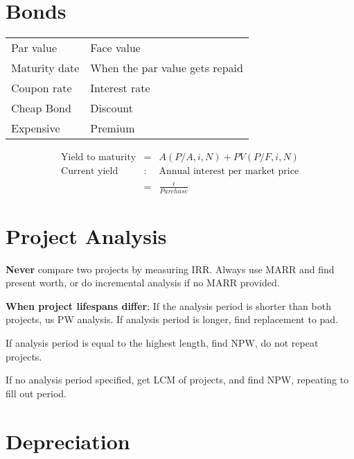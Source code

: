\documentclass[landscape, letterpaper, 10pt]{article}
\begin{document}
\begin{multicols}{3}
    \section*{Bonds}
    \begin{tabular}{|l|l|}
        \hline
        Par value     & Face value                     \\
        Maturity date & When the par value gets repaid \\\hline
        Coupon rate   & Interest rate                  \\\hline
        Cheap Bond    & Discount                       \\\hline
        Expensive     & Premium                        \\\hline
    \end{tabular}
    \begin{align*}
        \text{Yield to maturity} & = & A(P/A, i, N) + PV(P/F, i, N)            \\
        \text{Current yield}     & : & \text{Annual interest per market price} \\
                                 & = & \frac{i}{Purchase}
    \end{align*}
    \section*{Project Analysis}
    \textbf{Never} compare two projects by measuring IRR. Always use MARR and find present worth, or do incremental analysis if no MARR provided.

    \textbf{When project lifespans differ}: If the analysis period is shorter than both projects, us PW analysis. If analysis period is longer, find replacement to pad.

    If analysis period is equal to the highest length, find NPW, do not repeat projects.

    If no analysis period specified, get LCM of projects, and find NPW, repeating to fill out period.

    \section*{Depreciation}

\end{multicols}
\end{document}
